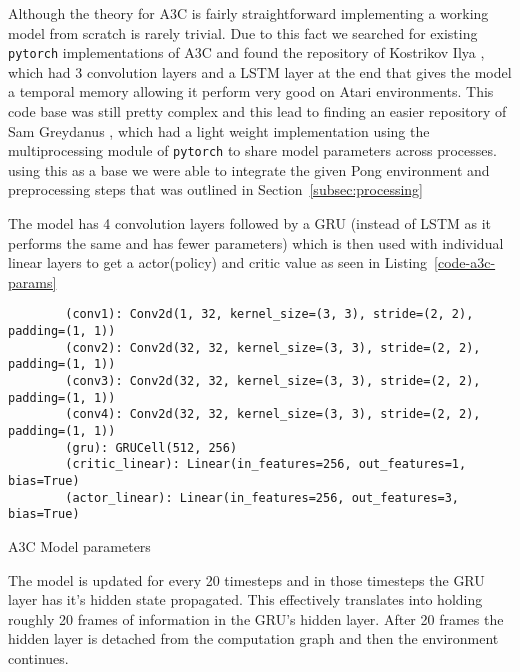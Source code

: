 \bigskip
\noindent
Although the theory for A3C is fairly straightforward implementing a working model from scratch is rarely trivial. Due to this fact we searched for existing \texttt{pytorch} implementations of A3C and found the repository of Kostrikov Ilya \cite{orig_a3c}, which had 3 convolution layers and a LSTM layer at the end that gives the model a temporal memory allowing it perform very good on Atari environments. This code base was still pretty complex and this lead to finding an easier repository of Sam Greydanus \cite{baby-a3c}, which had a light weight implementation using the multiprocessing module of \texttt{pytorch} to share model parameters across processes. using this as a base we were able to integrate the given Pong environment and preprocessing steps that was outlined in Section~\ref{subsec:processing}

The model has 4 convolution layers followed by a GRU (instead of LSTM as it performs the same and has fewer parameters) which is then used with individual linear layers to get a actor(policy) and critic value as seen in Listing~\ref{code-a3c-params}

\begin{listing}[ht]
    \begin{verbatim}
        (conv1): Conv2d(1, 32, kernel_size=(3, 3), stride=(2, 2), padding=(1, 1)) 
        (conv2): Conv2d(32, 32, kernel_size=(3, 3), stride=(2, 2), padding=(1, 1))
        (conv3): Conv2d(32, 32, kernel_size=(3, 3), stride=(2, 2), padding=(1, 1))
        (conv4): Conv2d(32, 32, kernel_size=(3, 3), stride=(2, 2), padding=(1, 1))
        (gru): GRUCell(512, 256)
        (critic_linear): Linear(in_features=256, out_features=1, bias=True)       
        (actor_linear): Linear(in_features=256, out_features=3, bias=True)  
      \end{verbatim}
    \caption{A3C Model parameters}
    \label{code-a3c-params}
\end{listing}

The model is updated for every 20 timesteps and in those timesteps the GRU layer has it's hidden state propagated. This effectively translates into holding roughly 20 frames of information in the GRU's hidden layer. After 20 frames the hidden layer is detached from the computation graph and then the environment continues.
    